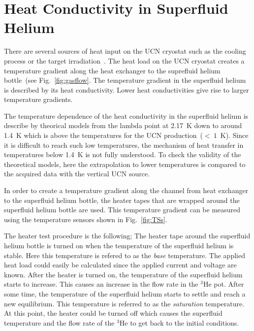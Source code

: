 \chapter{Heat Conductivity in Superfluid
  Helium~\label{sec:heattest}}


There are several sources of heat input on the UCN cryostat such as
the cooling process or the target
irradiation~\cite{Florian_thesis}. The heat load on the UCN cryostat
creates a temperature gradient along the heat exchanger to the
suprefluid helium bottle~(see Fig.~\ref{fig:gasflow}. The temperature
gradient in the superfluid helium is described by its heat
conductivity. Lower heat conductivities give rise to larger
temperature gradients.

The temperature dependence of the heat conductivity in the superfluid
helium is describe by theorical models from the lambda point at 2.17~K
down to around 1.4~K which is above the temperatures for the UCN
production~($<~1$~K). Since it is difficult to reach such low
temperatures, the mechanism of heat transfer in temperatures below
1.4~K is not fully understood.  To check the validity of the
theoretical models, here the extrapolation to lower temperatures is
compared to the acquired data with the vertical UCN source.


In order to create a temperature gradient along the channel from heat
exchanger to the superfluid helium bottle, the heater tapes that are
wrapped around the superfluid helium bottle are used.
This temperature gradient can be measured using the temperature
sensors shown in Fig.~\ref{fig:TSs}.

The heater test procedure is the following; The heater tape around the
superfluid helium bottle is turned on when the temperature of the
superfluid helium is stable. Here this temperature is refered to as
the {\it{base}} temperature. The applied heat load could easily be
calculated since the applied current and voltage are known. After the
heater is turned on, the temperature of the superfluid helium starts
to increase. This causes an increase in the flow rate in the $^3$He
pot. After some time, the temperature of the superfluid helium starts
to settle and reach a new equilibrium. This temperature is referred to
as the {\it{saturation}} temperature. At this point, the heater could
be turned off which causes the superfluid temperature and the flow
rate of the $^3$He to get back to the initial conditions.


